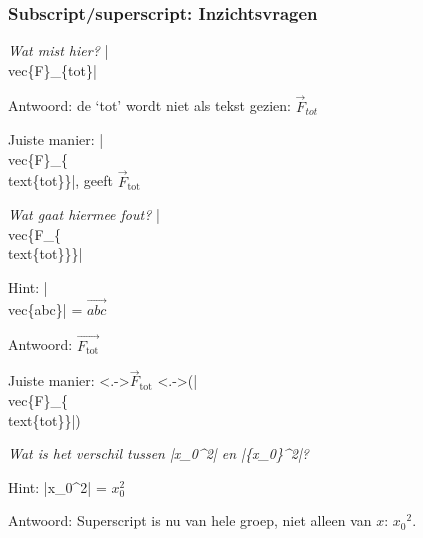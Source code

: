 \begin{frame}
	\frametitle{Subscript/superscript: Inzichtsvragen}

	\emph{Wat mist hier?} \hll|\\vec\{F\}_\{tot\}|
	
	\pause
	Antwoord: de `tot' wordt niet als tekst gezien: $ \vec{F}_{tot} $

	Juiste manier: \hll|\\vec\{F\}_\{\\text\{tot\}\}|, geeft $ \vec{F}_{\text{tot}} $

	\medskip

	\pause
	\emph{Wat gaat hiermee fout?} \hll|\\vec\{F_\{\\text\{tot\}\}\}|

	\pause Hint: \hll|\\vec\{abc\}| = $ \vec{abc} $

	\pause Antwoord: $ \vec{F_{\text{tot}}} $ \uncover<+->{(\hll|\\vec\{F_\{\\text\{tot\}\}\}|)}

	Juiste manier: \uncover<.->{$ \vec{F}_{\text{tot}} $} \uncover<.->{(\hll|\\vec\{F\}_\{\\text\{tot\}\}|)}

	\medskip

	\pause
	\emph{Wat is het verschil tussen \textnormal{\hll|x_0^2|} en \textnormal{\hll|\{x_0\}^2|}?}

	\pause Hint: \hll|x_0^2| = $ x_0^2 $

	\pause Antwoord: Superscript is nu van hele groep, niet alleen van $ x $: $ {x_0}^2 $.

\end{frame}
